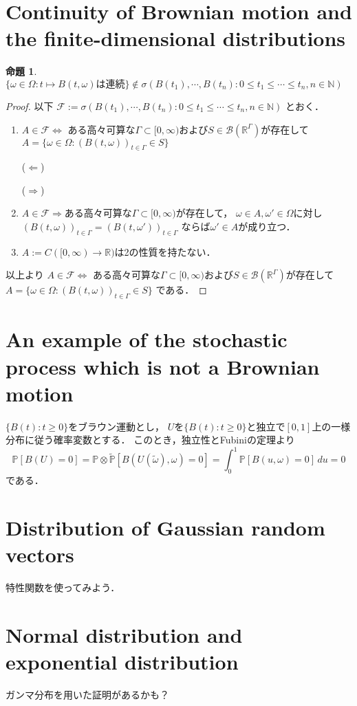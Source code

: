 \documentclass{jsarticle}
\theoremstyle{definition}
\newtheorem{prop}[defi]{命題}
\begin{document}
\section{Continuity of Brownian motion and the finite-dimensional distributions}

\begin{prop}
$\{\omega\in\Omega:t\mapsto B(t,\omega)は連続\}\notin
\sigma(B(t_1),\cdots,B(t_n):0\leq t_1\leq\cdots\leq t_n, n\in\mathbb{N})$
\end{prop}

\begin{proof}
以下
$\mathcal{F}:=\sigma(B(t_1),\cdots,B(t_n):0\leq t_1\leq\cdots\leq t_n, n\in\mathbb{N})$
とおく．
\begin{enumerate}
\item
$A\in\mathcal{F}\Leftrightarrow$
ある高々可算な$\Gamma\subset[0,\infty)$および$S\in\mathcal{B}(\mathbb{R}^\Gamma)$が存在して
$A=\{\omega\in\Omega:(B(t,\omega))_{t\in\Gamma}\in S\}$

($\Leftarrow$)

($\Rightarrow$)

\item
$A\in\mathcal{F}\Rightarrow$ある高々可算な$\Gamma\subset[0,\infty)$が存在して，
$\omega\in A,\omega'\in\Omega$に対し
$(B(t,\omega))_{t\in\Gamma}=(B(t,\omega'))_{t\in\Gamma}$
ならば$\omega'\in A$が成り立つ．

\item
$A:=C([0,\infty)\to\mathbb{R})$は2の性質を持たない．
\end{enumerate}
以上より
$A\in\mathcal{F}\Leftrightarrow$
ある高々可算な$\Gamma\subset[0,\infty)$および$S\in\mathcal{B}(\mathbb{R}^\Gamma)$が存在して
$A=\{\omega\in\Omega:(B(t,\omega))_{t\in\Gamma}\in S\}$
である．
\end{proof}

\section{An example of the stochastic process which is not a Brownian motion}
$\{B(t):t\geq0\}$をブラウン運動とし，
$U$を$\{B(t):t\geq0\}$と独立で$[0,1]$上の一様分布に従う確率変数とする．
このとき，独立性とFubiniの定理より
\[ \mathbb{P}[B(U)=0]
=\mathbb{P}\otimes\tilde{\mathbb{P}}[B(U(\tilde{\omega}),\omega)=0]
=\int_0^1\mathbb{P}[B(u,\omega)=0]\,du
=0 \]
である．

\section{Distribution of Gaussian random vectors}
特性関数を使ってみよう．

\section{Normal distribution and exponential distribution}
ガンマ分布を用いた証明があるかも？
\end{document}
